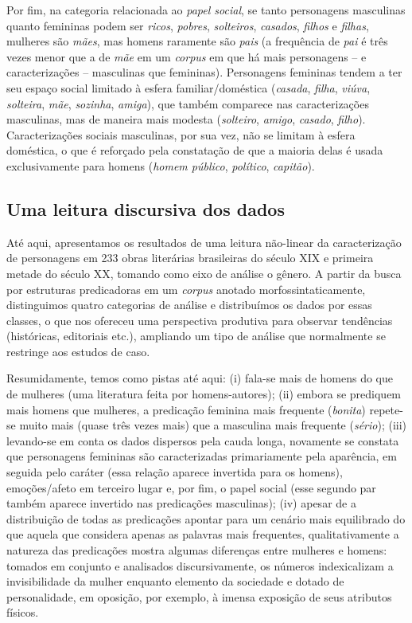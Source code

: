 \documentclass[portuguese]{textolivre}
\begin{document}
Por fim, na categoria relacionada ao \textit{papel social}, se tanto personagens masculinas quanto femininas podem ser \textit{ricos}, \textit{pobres}, \textit{solteiros}, \textit{casados}, \textit{filhos} e \textit{filhas}, mulheres são \textit{mães}, mas homens raramente são \textit{pais} (a frequência de \textit{pai} é três vezes menor que a de \textit{mãe} em um \textit{corpus} em que há mais personagens – e caracterizações – masculinas que femininas). Personagens femininas tendem a ter seu espaço social limitado à esfera familiar/doméstica (\textit{casada}, \textit{filha}, \textit{viúva}, \textit{solteira}, \textit{mãe}, \textit{sozinha}, \textit{amiga}), que também comparece nas caracterizações masculinas, mas de maneira mais modesta (\textit{solteiro}, \textit{amigo}, \textit{casado}, \textit{filho}). Caracterizações sociais masculinas, por sua vez, não se limitam à esfera doméstica, o que é reforçado pela constatação de que a maioria delas é usada exclusivamente para homens (\textit{homem público}, \textit{político}, \textit{capitão}).

\subsection{Uma leitura discursiva dos dados}\label{sec-formato}
Até aqui, apresentamos os resultados de uma leitura não-linear da caracterização de personagens em 233 obras literárias brasileiras do século XIX e primeira metade do século XX, tomando como eixo de análise o gênero. A partir da busca por estruturas predicadoras em um \textit{corpus} anotado morfossintaticamente, distinguimos quatro categorias de análise e distribuímos os dados por essas classes, o que nos ofereceu uma perspectiva produtiva para observar tendências (históricas, editoriais etc.), ampliando um tipo de análise que normalmente se restringe aos estudos de caso.

Resumidamente, temos como pistas até aqui: (i) fala-se mais de homens do que de mulheres (uma literatura feita por homens-autores); (ii) embora se prediquem mais homens que mulheres, a predicação feminina mais frequente (\textit{bonita}) repete-se muito mais (quase três vezes mais) que a masculina mais frequente (\textit{sério}); (iii) levando-se em conta os dados dispersos pela cauda longa, novamente se constata que personagens femininas são caracterizadas primariamente pela aparência, em seguida pelo caráter (essa relação aparece invertida para os homens), emoções/afeto em terceiro lugar e, por fim, o papel social (esse segundo par também aparece invertido nas predicações masculinas); (iv) apesar de a distribuição de todas as predicações apontar para um cenário mais equilibrado do que aquela que considera apenas as palavras mais frequentes, qualitativamente a natureza das predicações mostra algumas diferenças entre mulheres e homens: tomados em conjunto e analisados discursivamente, os números indexicalizam a invisibilidade da mulher enquanto elemento da sociedade e dotado de personalidade, em oposição, por exemplo, à imensa exposição de seus atributos físicos.
\end{document}
